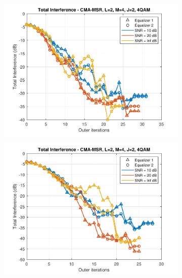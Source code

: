 \begin{figure}
\begin{subfigure}[b]{0.45\textwidth}
		\includegraphics[width=\linewidth]{./figs/BF_RTR_MSR_TI_4QAM_L=2_M=4_J=2_K=200.pdf}
		\label{fig:rtr_msr_ti200}
	\end{subfigure}
	\begin{subfigure}[b]{0.45\textwidth}
		\includegraphics[width=\linewidth]{./figs/BF_RTR_MSR_TI_4QAM_L=2_M=4_J=2_K=1000.pdf}
		\label{fig:rtr_msr_ti1000}
	\end{subfigure}
	\begin{subfigure}[b]{0.45\textwidth}

\end{subfigure}
\end{figure}
